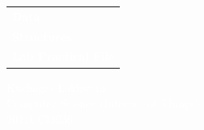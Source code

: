 \pagecolor{UoDDarkBlue}\afterpage{\nopagecolor}

\vspace*{5cm}

\begin{flushleft}
    \hspace{2cm}
    \begin{tabular}[hl]{@{}l@{}}
        \fontsize{55}{15}\selectfont\textcolor{white}{\textbf{Data}}       \\[2ex]
        \fontsize{55}{15}\selectfont\textcolor{white}{\textbf{Structures}} \\[4ex]
        \Large\textcolor{white}{\textbf{Lab Practical File}}
    \end{tabular}
    \hspace*{\fill}
\end{flushleft}

\vspace{\fill}

\hspace*{1.5cm}
\textcolor{white}{Kushagra Lakhwani}\\
\hspace*{2cm}
\textcolor{white}{Computer Science (Internet of Things)}\\
\hspace*{2cm}
\textcolor{white}{2021UCI8036}
\vspace*{2cm}

\thispagestyle{empty}



\restoregeometry
\newpage